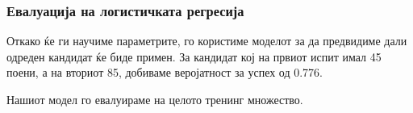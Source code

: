 \subsubsection{Евалуација на логистичката регресија}

Откако ќе ги научиме параметрите, го користиме моделот за да предвидиме дали
одреден кандидат ќе биде примен. За кандидат кој на првиот испит имал 45 поени,
а на вториот 85, добиваме веројатност за успех од 0.776.

Нашиот модел го евалуираме на целото тренинг множество.

